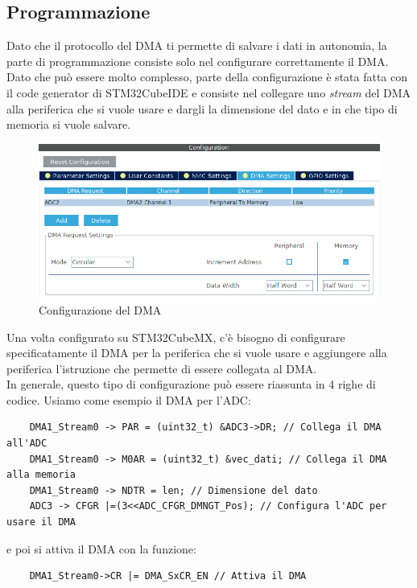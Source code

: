 \subsection{Programmazione}
Dato che il protocollo del DMA ti permette di salvare i dati in autonomia, la parte di programmazione consiste solo nel configurare correttamente il DMA.\\



Dato che può essere molto complesso, parte della configurazione è stata fatta con il code generator di STM32CubeIDE e consiste nel collegare uno \textit{stream} del DMA alla periferica che si vuole usare e dargli la dimensione del dato e in che tipo di memoria si vuole salvare.\\

\begin{figure}
    \centering
    \includegraphics[width=\linewidth]{microcontrollore/assets/dma_configuration.png}
    \caption{Configurazione del DMA}
    \label{fig:DMA}
\end{figure}

Una volta configurato su STM32CubeMX, c'è bisogno di configurare specificatamente il DMA per la periferica che si vuole usare e aggiungere alla periferica l'istruzione che permette di essere collegata al DMA.\\

In generale, questo tipo di configurazione può essere riassunta in 4 righe di codice. Usiamo come esempio il DMA per l'ADC:

\begin{verbatim}
    DMA1_Stream0 -> PAR = (uint32_t) &ADC3->DR; // Collega il DMA all'ADC
    DMA1_Stream0 -> M0AR = (uint32_t) &vec_dati; // Collega il DMA alla memoria
    DMA1_Stream0 -> NDTR = len; // Dimensione del dato
    ADC3 -> CFGR |=(3<<ADC_CFGR_DMNGT_Pos); // Configura l'ADC per usare il DMA
\end{verbatim}

e poi si attiva il DMA con la funzione:

\begin{verbatim}
    DMA1_Stream0->CR |= DMA_SxCR_EN // Attiva il DMA
\end{verbatim}

